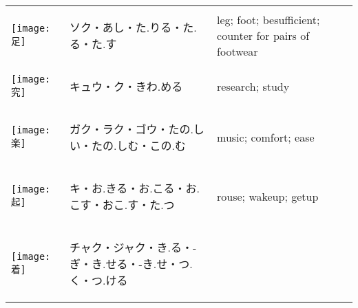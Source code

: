 \documentclass[a4paper,12pt]{extarticle}
\begin{document}
\begin{longtable}{|lp{6cm}p{4cm}|}
\\ 
\begin{minipage}{0.3\textwidth}
\centerline{
	\texttt{[image: 足]}
}
\end{minipage}
&
\begin{CJK}{UTF8}{min}ソク・あし・た.りる・た.る・た.す\end{CJK}
&
leg; foot; besufficient; counter for pairs of footwear
\\ 
\begin{minipage}{0.3\textwidth}
\centerline{
	\texttt{[image: 究]}
}
\end{minipage}
&
\begin{CJK}{UTF8}{min}キュウ・ク・きわ.める\end{CJK}
&
research; study
\\ 
\begin{minipage}{0.3\textwidth}
\centerline{
	\texttt{[image: 楽]}
}
\end{minipage}
&
\begin{CJK}{UTF8}{min}ガク・ラク・ゴウ・たの.しい・たの.しむ・この.む\end{CJK}
&
music; comfort; ease
\\ 
\begin{minipage}{0.3\textwidth}
\centerline{
	\texttt{[image: 起]}
}
\end{minipage}
&
\begin{CJK}{UTF8}{min}キ・お.きる・お.こる・お.こす・おこ.す・た.つ\end{CJK}
&
rouse; wakeup; getup
\\ 
\begin{minipage}{0.3\textwidth}
\centerline{
	\texttt{[image: 着]}
}
\end{minipage}
&
\begin{CJK}{UTF8}{min}チャク・ジャク・き.る・-ぎ・き.せる・-き.せ・つ.く・つ.ける\end{CJK}

\end{longtable}
\end{document}
